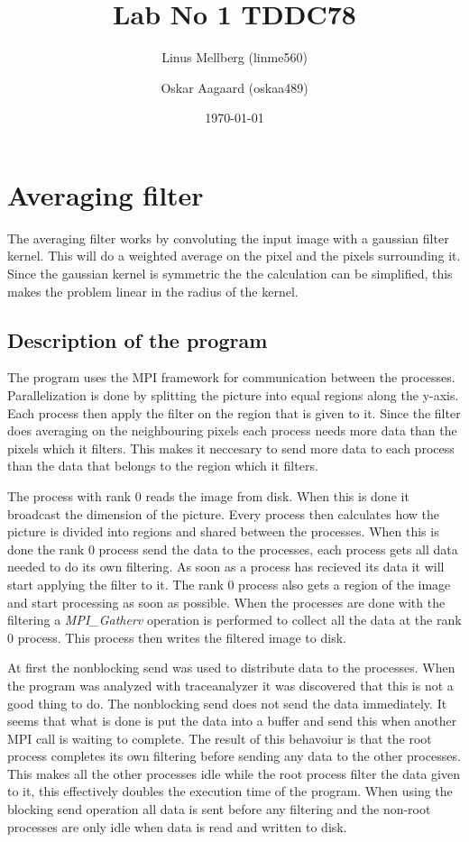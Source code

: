 \documentclass[a4paper,11pt]{article}
\begin{document}
\title{Lab No 1 TDDC78}
\author{Linus Mellberg (linme560) \and Oskar Aagaard (oskaa489)}
\date{\today}
\maketitle
\pagebreak
\thispagestyle{tcr}
\pagestyle{tcr}

\section{Averaging filter}
The averaging filter works by convoluting the input image with a gaussian filter kernel.
This will do a weighted average on the pixel and the pixels surrounding it.
Since the gaussian kernel is symmetric the the calculation can be simplified, this makes the problem linear in the radius of the kernel.
\subsection{Description of the program}
The program uses the MPI framework for communication between the processes.
Parallelization is done by splitting the picture into equal regions along the y-axis.
Each process then apply the filter on the region that is given to it. 
Since the filter does averaging on the neighbouring pixels each process needs more data than the pixels which it filters.
This makes it neccesary to send more data to each process than the data that belongs to the region which it filters.

The process with rank 0 reads the image from disk.
When this is done it broadcast the dimension of the picture.
Every process then calculates how the picture is divided into regions and shared between the processes.
When this is done the rank 0 process send the data to the processes, each process gets all data needed to do its own filtering.
As soon as a process has recieved its data it will start applying the filter to it.
The rank 0 process also gets a region of the image and start processing as soon as possible.
When the processes are done with the filtering a \emph{MPI\_Gatherv} operation is performed to collect all the data at the rank 0 process.
This process then writes the filtered image to disk.

At first the nonblocking send was used to distribute data to the processes.
When the program was analyzed with traceanalyzer it was discovered that this is not a good thing to do.
The nonblocking send does not send the data immediately.
It seems that what is done is put the data into a buffer and send this when another MPI call is waiting to complete.
The result of this behavoiur is that the root process completes its own filtering before sending any data to the other processes.
This makes all the other processes idle while the root process filter the data given to it, this effectively doubles the execution time of the program.
When using the blocking send operation all data is sent before any filtering and the non-root processes are only idle when data is read and written to disk.
\end{document}
